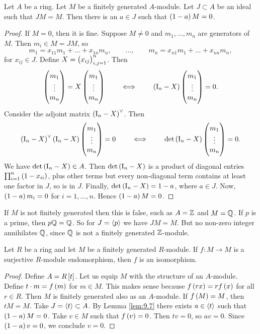 \begin{lemma}
\label{lem:9.7}
Let $ A $ be a ring. Let $ M $ be a finitely generated $ A $-module. Let $ J \subset A $ be an ideal such that $ JM = M $. Then there is an $ a \in J $ such that $ \br{1 - a}M = 0 $.
\end{lemma}

\begin{proof}
If $ M = 0 $, then it is fine. Suppose $ M \ne 0 $ and $ m_1, \dots, m_n $ are generators of $ M $. Then $ m_i \in M = JM $, so
$$ m_1 = x_{11}m_1 + \dots + x_{1n}m_n, \qquad \dots, \qquad m_n = x_{n1}m_1 + \dots + x_{nn}m_n, $$
for $ x_{ij} \in J $. Define $ X = \br{x_{ij}}_{i, j = 1}^n $. Then
$$ \threebyone{m_1}{\vdots}{m_n} = X\threebyone{m_1}{\vdots}{m_n} \qquad \iff \qquad \br{\I_n - X}\threebyone{m_1}{\vdots}{m_n} = 0. $$
Consider the adjoint matrix $ \br{\I_n - X}^\vee $. Then
$$ \br{\I_n - X}^\vee\br{\I_n - X}\threebyone{m_1}{\vdots}{m_n} = 0 \qquad \iff \qquad \det \br{\I_n - X}\threebyone{m_1}{\vdots}{m_n} = 0. $$
We have $ \det \br{\I_n - X} \in A $. Then $ \det \br{\I_n - X} $ is a product of diagonal entries $ \prod_{i = 1}^n \br{1 - x_{ii}} $, plus other terms but every non-diagonal term contains at least one factor in $ J $, so is in $ J $. Finally, $ \det \br{\I_n - X} = 1 - a $, where $ a \in J $. Now, $ \br{1 - a}m_i = 0 $ for $ i = 1, \dots, n $. Hence $ \br{1 - a}M = 0 $.
\end{proof}


\begin{remark*}
If $ M $ is not finitely generated then this is false, such as $ A = \mathbb{Z} $ and $ M = \mathbb{Q} $. If $ p $ is a prime, then $ p\mathbb{Q} = \mathbb{Q} $. So for $ J = \left\langle p \right\rangle $ we have $ JM = M $. But no non-zero integer annihilates $ \mathbb{Q} $, since $ \mathbb{Q} $ is not a finitely generated $ \mathbb{Z} $-module.
\end{remark*}

\begin{corollary}
Let $ R $ be a ring and let $ M $ be a finitely generated $ R $-module. If $ f : M \to M $ is a surjective $ R $-module endomorphism, then $ f $ is an isomorphism.
\end{corollary}

\begin{proof}
Define $ A = R\sbr{t} $. Let us equip $ M $ with the structure of an $ A $-module. Define $ t \cdot m = f\br{m} $ for $ m \in M $. This makes sense because $ f\br{rx} = rf\br{x} $ for all $ r \in R $. Then $ M $ is finitely generated also as an $ A $-module. If $ f\br{M} = M $, then $ tM = M $. Take $ J = \left\langle t \right\rangle \subset A $. By Lemma \ref{lem:9.7} there exists $ a \in \left\langle t \right\rangle $ such that $ \br{1 - a}M = 0 $. Take $ v \in M $ such that $ f\br{v} = 0 $. Then $ tv = 0 $, so $ av = 0 $. Since $ \br{1 - a}v = 0 $, we conclude $ v = 0 $.
\end{proof}

